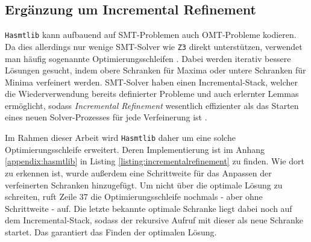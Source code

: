 \subsection{Ergänzung um Incremental Refinement}
\label{subsec:incrementalrefinement}
\texttt{Hasmtlib} kann aufbauend auf SMT-Problemen auch OMT-Probleme kodieren.
Da dies allerdings nur wenige SMT-Solver wie \texttt{Z3} direkt unterstützen, verwendet man häufig sogenannte Optimierungsschleifen \cite{nuz3}.
Dabei werden iterativ bessere Lösungen gesucht, indem obere Schranken für Maxima oder untere Schranken für Minima verfeinert werden.
SMT-Solver haben einen Incremental-Stack, welcher die Wiederverwendung bereits definierter Probleme und auch erlernter Lemmas ermöglicht,
sodass \textit{Incremental Refinement} wesentlich effizienter als das Starten eines neuen Solver-Prozesses für jede Verfeinerung ist \cite{incremental}.

Im Rahmen dieser Arbeit wird \texttt{Hasmtlib} daher um eine solche Optimierungsschleife erweitert.
Deren Implementierung ist im Anhang \ref{appendix:hasmtlib} in Listing \ref{listing:incrementalrefinement} zu finden.
Wie dort zu erkennen ist, wurde außerdem eine Schrittweite für das Anpassen der verfeinerten Schranken hinzugefügt.
Um nicht über die optimale Lösung zu schreiten, ruft Zeile 37 die Optimierungsschleife nochmals - aber ohne Schrittweite - auf.
Die letzte bekannte optimale Schranke liegt dabei noch auf dem Incremental-Stack, sodass der rekursive Aufruf mit dieser als neue Schranke startet.
Das garantiert das Finden der optimalen Lösung.
